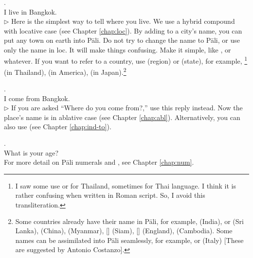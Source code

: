 \label{conv:bangkok}\medskip
{}. \\
\hspace*{10mm}I live in Bangkok.\\
{\small $\triangleright$ Here is the simplest way to tell where you live. We use a hybrid compound with locative case (see Chapter \ref{chap:loc}). By adding  to a city's name, you can put any town on earth into P\=ali. Do not try to change the name to P\=ali, or use only the name in loc. It will make things confusing. Make it simple, like , or whatever. If you want to refer to a country, use  (region) or  (state), for example, \footnote{I saw some use  or  for Thailand, sometimes  for Thai language. I think it is rather confusing when written in Roman script. So, I avoid this transliteration.} (in Thailand),  (in America),  (in Japan).\footnote{Some countries already have their name in P\=ali, for example,  (India),  or  (Sri Lanka),  (China),  (Myanmar),  [] (Siam),  [] (England),  (Cambodia). Some names can be assimilated into P\=ali seamlessly, for example,  or  (Italy) [These are suggested by Antonio Costanzo].}}

\medskip
{}. \\
\hspace*{12mm}I come from Bangkok.\\
{\small $\triangleright$ If you are asked ``Where do you come from?,'' use this reply instead. Now the place's name is in ablative case (see Chapter \ref{chap:abl}). Alternatively, you can also use  (see Chapter \ref{chap:ind-to}).}

\medskip
{}. \\
\hspace*{12mm}What is your age?\\
For more detail on P\=ali numerals and , see Chapter \ref{chap:num}.

